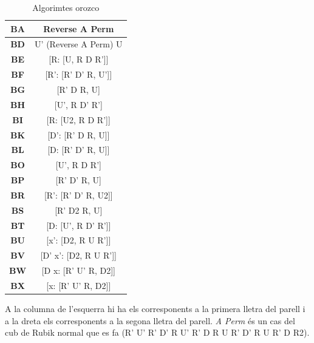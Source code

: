 \begin{table}[h]
    \begin{minipage}{.5\linewidth}
        \centering
        \begin{tabular}{|c|c|}
            \hline
            \textbf{BA} & Reverse A Perm \\
            \hline
            \textbf{BD} & U' (Reverse A Perm) U \\
            \hline
            \textbf{BE} & [R: [U, R D R']] \\
            \hline
            \textbf{BF} & [R': [R' D' R, U']] \\
            \hline
            \textbf{BG} & [R' D R, U] \\
            \hline
            \textbf{BH} & [U', R D' R'] \\
            \hline
            \textbf{BI} & [R: [U2, R D R']] \\
            \hline
            \textbf{BK} & [D': [R' D R, U]] \\
            \hline
            \textbf{BL} & [D: [R' D' R, U]] \\
            \hline
            \textbf{BO} & [U', R D R'] \\
            \hline
            \textbf{BP} & [R' D' R, U] \\
            \hline
            \textbf{BR} & [R': [R' D' R, U2]] \\
            \hline
            \textbf{BS} & [R' D2 R, U] \\
            \hline
            \textbf{BT} & [D: [U', R D' R']] \\
            \hline
            \textbf{BU} & [x': [D2, R U R']] \\
            \hline
            \textbf{BV} & [D' x': [D2, R U R']] \\
            \hline
            \textbf{BW} & [D x: [R' U' R, D2]] \\
            \hline
            \textbf{BX} & [x: [R' U' R, D2]] \\
            \hline 
        \end{tabular}
    \end{minipage} 
    \caption{Algorimtes orozco}
\end{table}

A la columna de l'esquerra hi ha els corresponents a la primera lletra del parell i a la dreta
els corresponents a la segona lletra del parell. \textit{A Perm} és un cas del cub de Rubik normal que es fa (R' U' R' D' R U' R' D R U R' D' R U R' D R2).

